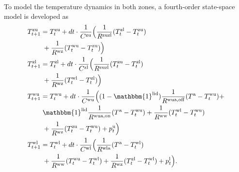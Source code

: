 \documentclass[sigconf]{acmart}
\begin{document}
To model the temperature dynamics in both zones, a fourth-order state-space model is developed as
%
\begingroup
\allowdisplaybreaks
\begin{subequations}\label{eq:StateSpaceModel}
    \begin{align}
        T^{\text{zu}}_{t+1} & = T^{\text{zu}}_{t} + dt \cdot \frac{1}{C^{\text{zu}}}\Bigl( \frac{1}{R^{\text{zuzl}}} (T^{\text{zl}}_{t} - T^{\text{zu}}_{t}) \notag                                     \\ & \mspace{5mu} + \frac{1}{R^{\text{wz}}} (T^{\text{wu}}_{t} - T^{\text{zu}}_{t}) \Bigr) \label{eq1:StateSpaceModel} \\
        T^{\text{zl}}_{t+1} & = T^{\text{zl}}_{t} + dt \cdot \frac{1}{C^{\text{zl}}}\Bigl( \frac{1}{R^{\text{zuzl}}} (T^{\text{zu}}_{t} - T^{\text{zl}}_{t}) \notag                                     \\ & \mspace{5mu} + \frac{1}{R^{\text{wz}}} (T^{\text{wl}}_{t} - T^{\text{zl}}_{t}) \Bigr) \label{eq2:StateSpaceModel} \\
        T^{\text{wu}}_{t+1} & = T^{\text{wu}}_{t} + dt \cdot \frac{1}{C^{\text{wu}}}\Bigl( (1-\mathbbm{1}^{\text{lid}}) \frac{1}{R^{\text{wua},\text{off}}} (T^{\text{a}} - T^{\text{wu}}_{t}) \notag + \\ & \mspace{5mu} \mathbbm{1}^{\text{lid}} \frac{1}{R^{\text{wua},\text{on}}} (T^{\text{a}} - T^{\text{wu}}_{t}) + \frac{1}{R^{\text{ww}}} (T^{\text{wl}}_{t} - T^{\text{wu}}_{t}) \notag \\ & \mspace{5mu} + \frac{1}{R^{\text{wz}}} (T^{\text{zu}}_{t} - T^{\text{wu}}_{t}) + p^{\text{u}}_{t} \Bigr) \label{eq3:StateSpaceModel} \\
        T^{\text{wl}}_{t+1} & = T^{\text{wl}}_{t} + dt \cdot \frac{1}{C^{\text{wl}}}\Bigl( \frac{1}{R^{\text{wla}}} (T^{\text{a}} - T^{\text{wl}}_{t}) \notag                                           \\ & \mspace{5mu} + \frac{1}{R^{\text{ww}}} (T^{\text{wu}}_{t} - T^{\text{wl}}_{t}) + \frac{1}{R^{\text{wz}}} (T^{\text{zl}}_{t} - T^{\text{wl}}_{t}) + p^{\text{l}}_{t} \Bigr). \label{eq4:StateSpaceModel}
    \end{align}
\end{subequations}
\endgroup
\end{document}
